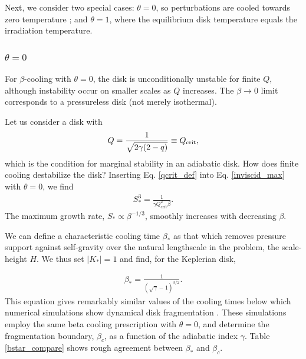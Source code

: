 Next, we consider two special cases: $\theta=0$, so perturbations are
cooled towards zero temperature \citep[typically employed in
numerical simulations, e.g.][]{gammie01}; and $\theta=1$, where the
equilibrium disk temperature equals the irradiation temperature.  

\subsubsection{$\theta = 0$}\label{theta0}
For $\beta$-cooling with $\theta=0$, the disk is unconditionally
unstable for finite $Q$, although instability occur on smaller scales
as $Q$ increases.  The $\beta\to0$ limit corresponds to a 
pressureless disk (not merely isothermal).   

Let us consider a disk with 
\begin{align}\label{qcrit_def}
  Q = \frac{1}{\sqrt{2\gamma(2-q)}}\equiv Q_{\mathrm{crit}},
\end{align} 
which is the condition for marginal stability in an adiabatic disk. 
How does finite cooling destabilize the disk?  
Inserting Eq. \ref{qcrit_def} into Eq. \ref{inviscid_max} with 
$\theta=0$, we find 
\begin{align}\label{sstar}
  S_*^3 = \frac{1}{\gamma Q_\mathrm{crit}^2 \beta}. 
\end{align}
The maximum growth rate, $S_*\propto \beta^{-1/3}$, smoothly
increases with decreasing $\beta$. 

We can define a characteristic cooling
time $\beta_*$ as that which removes pressure support against
self-gravity over the natural lengthscale in the problem, the
scale-height $H$. We thus set $|K_*|=1$ and find, for the Keplerian
disk,  

\begin{align}\label{betastar}
  \beta_* = \frac{1}{\left(\sqrt{\gamma} - 1\right)^{3/2}}. 
\end{align}
This equation gives remarkably similar values 
of the cooling times below which 
numerical simulations show dynamical disk fragmentation 
\citep{gammie01,rice05,rice11}. These simulations employ the same beta  
cooling prescription with $\theta=0$, and determine the fragmentation
boundary, $\beta_c$, as a function of the adiabatic index $\gamma$.  
Table \ref{bstar_compare} shows rough agreement between $\beta_*$ and 
$\beta_c$.  

